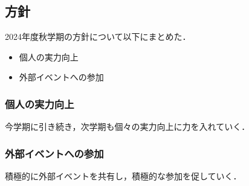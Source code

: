 \subsection*{\newGradeIfKouki{}\secondGrade{}方針}


2024年度秋学期の\secondGrade{}方針について以下にまとめた．

\begin{itemize}
    \item 個人の実力向上
    \item 外部イベントへの参加
\end{itemize}

\subsubsection*{個人の実力向上}
今学期に引き続き，次学期も個々の実力向上に力を入れていく．

\subsubsection*{外部イベントへの参加}
積極的に外部イベントを共有し，積極的な参加を促していく．
